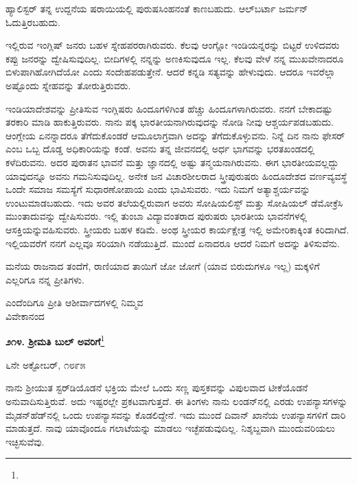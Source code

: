ಹ್ಯಾಲಿಸ್ಟರ್ ತನ್ನ ಉದ್ದನೆಯ ಷರಾಯಿಯಲ್ಲಿ ಪುರುಷಸಿಂಹನಂತೆ ಕಾಣಬಹುದು. ಆಲ್‌ಬರ್ಟಾ ಜರ್ಮನ್ ಓದುತ್ತಿರಬಹುದು.

ಇಲ್ಲಿರುವ ಇಂಗ್ಲಿಷ್ ಜನರು ಬಹಳ ಸ್ನೇಹಪರರಾಗಿರುವರು. ಕೆಲವು ಆಂಗ್ಲೋ ಇಂಡಿಯನ್ನರನ್ನು ಬಿಟ್ಟರೆ ಉಳಿದವರು ಕಪ್ಪು ಜನರನ್ನು ದ್ವೇಷಿಸುವುದಿಲ್ಲ. ಬೀದಿಗಳಲ್ಲಿ ನನ್ನನ್ನು ಅಣಕಿಸುವುದೂ ಇಲ್ಲ. ಕೆಲವು ವೇಳೆ ನನ್ನ ಮುಖವೇನಾದರೂ ಬಿಳುಪಾಗಿಹೋಗಿದೆಯೋ ಎಂದು ಸಂದೇಹಪಡುತ್ತೇನೆ. ಆದರೆ ಕನ್ನಡಿ ಸತ್ಯವನ್ನು ಹೇಳುವುದು. ಆದರೂ ಇವರೆಲ್ಲಾ ಅಷ್ಟೊಂದು ಸ್ನೇಹವನ್ನು ತೋರುತ್ತಿರುವರು.

ಇಂಡಿಯಾದೇಶವನ್ನು ಪ್ರೀತಿಸುವ ಇಂಗ್ಲಿಷರು ಹಿಂದೂಗಳಿಗಿಂತ ಹೆಚ್ಚು ಹಿಂದೂಗಳಾಗಿರುವರು. ನನಗೆ ಬೇಕಾದಷ್ಟು ತರಕಾರಿ ಮಾಡಿ ಹಾಕುತ್ತಿರುವರು. ನಾನು ಪಕ್ಕ ಭಾರತೀಯನಾಗಿರುವುದನ್ನು ನೋಡಿ ನೀವು ಆಶ್ಚರ್ಯಪಡಬಹುದು. ಆಂಗ್ಲೇಯ ಏನನ್ನಾ\break ದರೂ ತೆಗೆದುಕೊಂಡರೆ ಆಮೂಲಾಗ್ರವಾಗಿ ಅದನ್ನು ತೆಗೆದುಕೊಳ್ಳುವನು. ನಿನ್ನೆ ದಿನ ನಾನು ಫೇಸರ್‌ ಎಂಬ ಒಬ್ಬ ದೊಡ್ಡ ಅಧಿಕಾರಿಯನ್ನು ಕಂಡೆ. ಅವನು ತನ್ನ ಜೀವನದಲ್ಲಿ ಅರ್ಧ ಭಾಗವನ್ನು ಭರತಖಂಡದಲ್ಲಿ ಕಳೆದಿರುವನು. ಅದರ ಪುರಾತನ ಭಾವನೆ ಮತ್ತು ಜ್ಞಾನದಲ್ಲಿ ಅಷ್ಟು ತನ್ಮಯನಾಗಿರುವನು. ಈಗ ಭಾರತೀಯವಲ್ಲದ್ದು ಯಾವುದನ್ನೂ ಅವನು ಗಮನಿಸುವುದಿಲ್ಲ. ಅನೇಕ ಜನ ವಿಚಾರಶೀಲರಾದ ಸ್ತ್ರೀಪುರುಷರು ಹಿಂದೂದೇಶದ ವರ್ಣವ್ಯವಸ್ಥೆ ಒಂದೇ ಸಮಾಜ ಸಮಸ್ಯೆಗೆ ಸುಧಾರಣೋಪಾಯ ಎಂದು ಭಾವಿಸುವರು. ಇದು ನಿಮಗೆ ಅತ್ಯಾಶ್ಚರ್ಯವನ್ನು ಉಂಟುಮಾಡಬಹುದು. ಇದು ಅವರ ತಲೆಯಲ್ಲಿರುವಾಗ ಅವರು ಸೋಷಿಯಲಿಸ್ಟ್ ಮತ್ತು ಸೋಷಿಯಲ್ ಡೆಮೋಕ್ರೆಸಿ ಮುಂತಾದುವನ್ನು ದ್ವೇಷಿಸುವರು. ಇಲ್ಲಿ ತುಂಬಾ ವಿದ್ಯಾವಂತರಾದ ಪುರುಷರು ಭಾರತೀಯ ಭಾವನೆಗಳಲ್ಲಿ ಆಸಕ್ತಿಯನ್ನು\break ವಹಿಸುವರು. ಸ್ತ್ರೀಯರು ಬಹಳ ಕಡಿಮೆ. ಅಂಥ ಸ್ತ್ರೀಯರ ಕಾರ್ಯಕ್ಷೇತ್ರ ಇಲ್ಲಿ ಅಮೇರಿಕಾಕ್ಕಿಂತ ಕಿರಿದಾಗಿದೆ. ಇಲ್ಲಿಯವರೆಗೆ ನನಗೆ ಎಲ್ಲವೂ ಸರಿಯಾಗಿ ನಡೆಯುತ್ತಿದೆ. ಮುಂದೆ ಏನಾದರೂ ಆದರೆ ನಿಮಗೆ ಅದನ್ನು ತಿಳಿಸುವೆನು.

ಮನೆಯ ರಾಜನಾದ ತಂದೆಗೆ, ರಾಣಿಯಾದ ತಾಯಿಗೆ ಜೋ ಜೋಗೆ (ಯಾವ ಬಿರುದುಗಳೂ ಇಲ್ಲ) ಮಕ್ಕಳಿಗೆ ಎಲ್ಲರಿಗೂ ನನ್ನ ಪ್ರೀತಿಗಳು.

\vspace{-0.3cm}

{\flushright
ಎಂದೆಂದಿಗೂ ಪ್ರೀತಿ ಆಶೀರ್ವಾದಗಳಲ್ಲಿ ನಿಮ್ಮವ\\ವಿವೇಕಾನಂದ\par}

\begin{center}
\textbf{೨೧೪. ಶ‍್ರೀಮತಿ ಬುಲ್ ಅವರಿಗೆ}\footnote{}
\end{center}

\vspace{-0.65cm}

\begin{flushright}
೬ನೇ ಅಕ್ಟೋಬರ್, ೧೮೯೫
\end{flushright}

ನಾನು ಶ‍್ರೀಯುತ ಸ್ಟರ್‌ಡಿಯೊಡನೆ ಭಕ್ತಿಯ ಮೇಲೆ ಒಂದು ಸಣ್ಣ ಪುಸ್ತಕವನ್ನು ವಿಪುಲವಾದ ಟೀಕೆಯೊಡನೆ ಅನುವಾದಿಸುತ್ತಿರುವೆ. ಅದು ಇಷ್ಟರಲ್ಲೇ ಪ್ರಕಟವಾಗುತ್ತದೆ. ಈ ತಿಂಗಳು ನಾನು ಲಂಡನ್‌ನಲ್ಲಿ ಎರಡು ಉಪನ್ಯಾಸಗಳನ್ನು ಮೈಡನ್‌ಹೆಡ್‌ನಲ್ಲಿ ಒಂದು ಉಪನ್ಯಾಸವನ್ನು ಕೊಡಲಿದ್ದೇನೆ. ಇದು ಮುಂದೆ ದಿವಾನ್ ಖಾನೆಯ ಉಪನ್ಯಾಸಗಳಿಗೆ ದಾರಿ ಮಾಡುತ್ತದೆ. ನಾವು ಯಾವೊಂದೂ ಗಲಾಟೆಯನ್ನು ಮಾಡಲು ಇಚ್ಛೆಪಡುವುದಿಲ್ಲ. ನಿಶ್ಶಬ್ದವಾಗಿ ಮುಂದುವರಿಯಲು ಇಚ್ಛಿಸುವೆವು.

